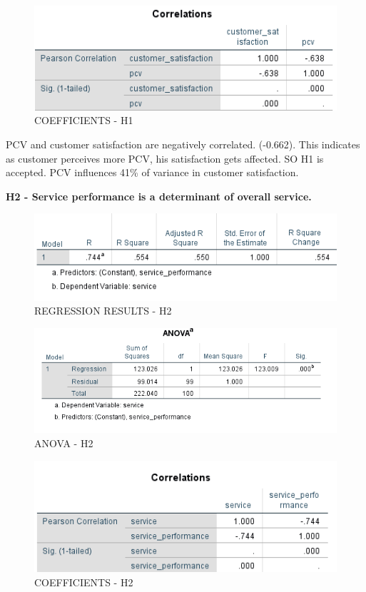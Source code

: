\documentclass[a4paper, 12pt]{extarticle}
\begin{document}
{\begin{figure}[H]
\centering
\includegraphics[scale=1]{h1.png}
\caption{COEFFICIENTS - H1}
\end{figure}

PCV and customer satisfaction are negatively correlated. (-0.662). This indicates as customer perceives more PCV, his satisfaction gets affected. SO H1 is accepted.
PCV influences 41\% of variance in customer satisfaction.\\
\newpage
\par \textbf{H2 - Service performance is a determinant of overall service.}\\
\begin{figure}[H]
\centering
\includegraphics[scale=1]{service_performance_vs_service.png}
\caption{REGRESSION RESULTS - H2}
\end{figure}


\begin{figure}[H]
\centering
\includegraphics[scale=1]{anova_s_sp.png}
\caption{ANOVA - H2}
\end{figure}

\begin{figure}[H]
\centering
\includegraphics[scale=1]{h2.png}
\caption{COEFFICIENTS - H2}
\end{figure}

}
\end{document}
